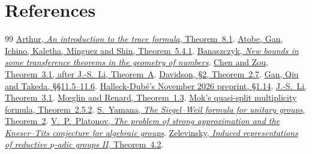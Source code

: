 \documentclass[a4paper,11pt]{article}
\theoremstyle{definition}
\theoremstyle{remark}
\numberwithin{equation}{section}
\begin{document}
\clearpage
\section{References}\label{nav:bibliography-XV}
\begingroup{}\begin{thebibliography}{99}\small
{} \href{https://www.claymath.org/library/cw/arthur/pdf/61.pdf}{Arthur, \emph{An introduction to the trace formula}, Theorem~8.1}.
 \href{https://arxiv.org/pdf/2410.13504}{Atobe, Gan, Ichino, Kaletha, M\'inguez and Shin, Theorem~5.4.1}.
 \href{https://doi.org/10.1007/BF01445125}{Banaszczyk, \emph{New bounds in some transference theorems in the geometry of numbers}}.
 \href{https://arxiv.org/pdf/2103.07956}{Chen and Zou, Theorem~3.1, after J.-S.~Li, Theorem~A}.
 \href{https://msp.org/pjm/1987/129-1/pjm-v129-n1-p02-s.pdf}{Davidson, \S2, Theorem~2.7}.
 \href{https://arxiv.org/pdf/1207.4709}{Gan, Qiu and Takeda, \S\S11.5--11.6}.
 \href{https://arxiv.org/abs/2611.26750}{Halleck-Dub\'e's November 2026 preprint, \S1.14}.
 \href{https://doi.org/10.1515/crll.1992.428.177}{J.-S.~Li, Theorem~3.1}.
 \href{https://webusers.imj-prg.fr/~colette.moeglin/MR7.pdf}{M{\oe}glin and Renard, Theorem~1.3}.
 \href{https://arxiv.org/pdf/1206.0882}{Mok's quasi-split multiplicity formula, Theorem~2.5.2}.
 \href{https://msp.org/pjm/2013/264-1/pjm-v264-n1-p11-s.pdf}{S.~Yamana, \emph{The Siegel--Weil formula for unitary groups}, Theorem~2}.
 \href{https://www.mathnet.ru/eng/im2220}{V.~P.~Platonov, \emph{The problem of strong approximation and the Kneser--Tits conjecture for algebraic groups}}.
 \href{https://www.numdam.org/article/ASENS_1980_4_13_2_165_0.pdf}{Zelevinsky, \emph{Induced representations of reductive \(p\)-adic groups II}, Theorem~4.2}.
\end{thebibliography}\endgroup
\end{document}

